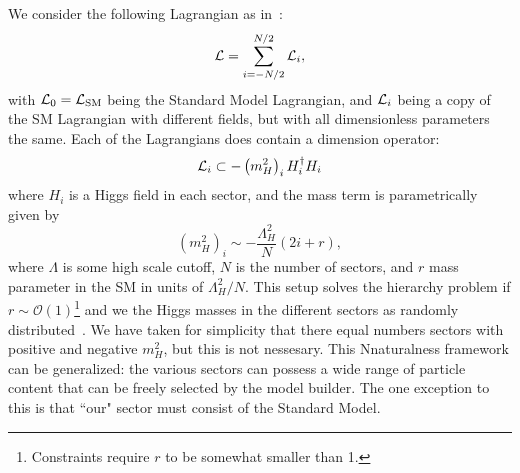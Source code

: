 \documentclass[nofootinbib,twocolumn,preprintnumbers]{revtex4-1}
\begin{document}


We consider the following Lagrangian as in~\cite{Arkani-Hamed:2016rle}:
\begin{equation}
{\cal L} = \sum_{i=-N/2}^{N/2} {\cal L}_i,
\end{equation}
with ${\cal L}_0 = {\cal L}_{\rm SM}$ being the Standard Model Lagrangian, and ${\cal L}_i$ being a copy of the SM Lagrangian with different fields, but with all dimensionless parameters the same. Each of the Lagrangians does contain a dimension operator:
\begin{equation}
{\cal L}_i \subset  - \left(m_H^2\right)_i H_i^\dagger H_i  
\end{equation}
where $H_i$ is a Higgs field in each sector, and the mass term is parametrically given by
\begin{equation}\label{eqn:massParam}
\left(m_H^2\right)_i \sim -\frac{\Lambda_H^2}{N}(2i+r),
\end{equation}
where $\Lambda$ is some high scale cutoff, $N$ is the number of sectors, and $r$ mass parameter in the SM in units of $\Lambda_H^2/N$. This setup solves the hierarchy problem if $r \sim \mathcal{O}(1)$\footnote{Constraints require $r$ to be somewhat smaller than 1.} and we the Higgs masses in the different sectors as randomly distributed~\cite{Arkani-Hamed:2016rle}. We have taken for simplicity that there equal numbers sectors with positive and negative $m_H^2$, but this is not nessesary. This Nnaturalness framework can be generalized: the various sectors can possess a wide range of particle content that can be freely selected by the model builder. The one exception to this is that ``our" sector must consist of the Standard Model.
\end{document}
